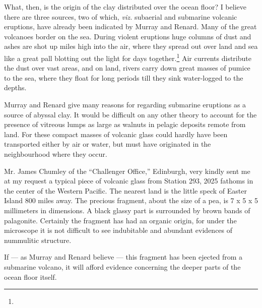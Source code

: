 \documentclass[a4paper, 12pt, oneside]{article}
\begin{document}
What, then, is the origin of the clay distributed over the ocean floor? I believe there are three sources, two of which, \emph{viz.} subaerial and submarine volcanic eruptions, have already been indicated by Murray and Renard. Many of the great volcanoes border on the sea. During violent eruptions huge columns of dust and ashes are shot up miles high into the air, where they spread out over land and sea like a great pall blotting out the light for days together.\footnote{} Air currents distribute the dust over vast areas, and on land, rivers carry down great masses of pumice to the sea, where they float for long periods till they sink water-logged to the depths.

Murray and Renard give many reasons for regarding submarine eruptions as a source of abyssal clay. It would be difficult on any other theory to account for the presence of vitreous lumps as large as walnuts in pelagic deposits remote from land. For these compact masses of volcanic glass could hardly have been transported either by air or water, but must have originated in the neighbourhood where they occur.

Mr. James Chumley of the ``Challenger Office,'' Edinburgh, very kindly sent me at my request a typical piece of volcanic glass from Station 293, 2025 fathoms in the center of the Western Pacific. The nearest land is the little speck of Easter Island 800 miles away. The precious fragment, about the size of a pea, is 7 x 5 x 5 millimeters in dimensions. A black glassy part is surrounded by brown bands of palagonite. Certainly the fragment has had an organic origin, for under the microscope it is not difficult to see indubitable and abundant evidences of nummulitic structure.

If --- as Murray and Renard believe --- this fragment has been ejected from a submarine volcano, it will afford evidence concerning the deeper parts of the ocean floor itself.
\end{document}
